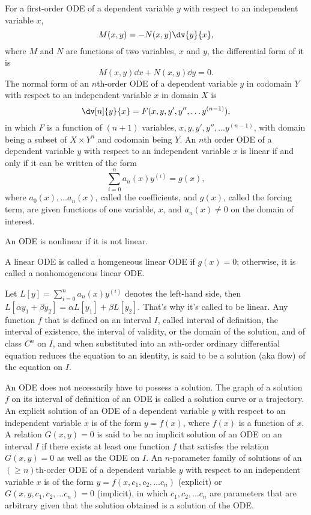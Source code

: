 \documentclass[a4paper,12pt]{report}
\begin{document}
\begin{itemize}
\begin{itemize}
For a first-order ODE of a dependent variable $y$ with respect to an independent variable $x$,
\[M(x,y)=-N(x,y)\dv{y}{x},\]
where $M$ and $N$ are functions of two variables, $x$ and $y$, the differential form of it is
\[M(x,y)\dd{x}+N(x,y)\dd{y}=0.\]
The normal form of an $n$th-order ODE of a dependent variable $y$ in codomain $Y$ with respect to an independent variable $x$ in domain $X$ is
\[\dv[n]{y}{x}=F(x,y,y',y'',\dots y^{(n-1)}),\]
in which $F$ is a function of $(n+1)$ variables, $x,y,y',y'',\dots y^{(n-1)}$, with domain being a subset of $X\times Y^n$ and codomain being $Y$.
An $n$th order ODE of a dependent variable $y$ with respect to an independent variable $x$ is linear if and only if it can be written of the form
\[\sum_{i=0}^na_n(x)y^{(i)}=g(x),\]
where $a_0(x),\dots a_n(x)$, called the coefficients, and $g(x)$, called the forcing term, are given functions of one variable, $x$, and $a_n(x)\neq 0$ on the domain of interest.

An ODE is nonlinear if it is not linear.

A linear ODE is called a homgeneous linear ODE if $g(x)=0$; otherwise, it is called a nonhomogeneous linear ODE.

Let $L[y]=\sum_{i=0}^na_n(x)y^{(i)}$ denotes the left-hand side, then $L[\alpha y_1+\beta y_2]=\alpha L[y_1]+\beta L[y_2]$. That's why it's called to be linear.
Any function $f$ that is defined on an interval $I$, called interval of definition, the interval of existence, the interval of validity, or the domain of the solution, and of class $C^n$ on $I$, and when substituted into an $n$th-order ordinary differential equation reduces the equation to an identity, is said to be a solution (aka flow) of the equation on $I$.

An ODE does not necessarily have to possess a solution.
The graph of a solution $f$ on its interval of definition of an ODE is called a solution curve or a trajectory.
An explicit solution of an ODE of a dependent variable $y$ with respect to an independent variable $x$ is of the form $y=f(x)$, where $f(x)$ is a function of $x$.
A relation $G(x, y) = 0$ is said to be an implicit solution of an ODE on an interval $I$ if there exists at least one function $f$ that satisfes the relation $G(x, y) = 0$ as well as the ODE on $I$.
An $n$-parameter family of solutions of an $(\geq n)$th-order ODE of a dependent variable $y$ with respect to an independent variable $x$ is of the form $y=f(x,c_1,c_2,\dots c_n)$ (explicit) or $G(x,y,c_1,c_2,\dots c_n)=0$ (implicit), in which $c_1,c_2,\dots c_n$ are parameters that are arbitrary given that the solution obtained is a solution of the ODE.


\end{itemize}
\end{itemize}
\end{document}
